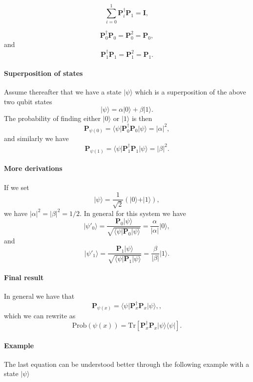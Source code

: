 \[
\sum_{i=0}^1\bm{P}_i^{\dagger}\bm{P}_1=\bm{I},
\]

\[
\bm{P}_0^{\dagger}\bm{P}_0=\bm{P}_0^2=\bm{P}_0,
\]
and
\[
\bm{P}_1^{\dagger}\bm{P}_1=\bm{P}_1^2=\bm{P}_1.
\]


\paragraph{Superposition of states}

Assume thereafter that we have a state $\vert \psi\rangle$ which is a superposition of the above two qubit states
\[
\vert \psi \rangle = \alpha\vert 0 \rangle + \beta \vert 1\rangle.
\]
The probability of finding either $\vert 0\rangle$ or $\vert 1\rangle$ is then
\[
\bm{P}_{\psi(0)}=\langle \psi\vert \bm{P}_0^{\dagger}\bm{P}_0\vert \psi\rangle=\vert \alpha\vert^2,
\]
and similarly we have 
\[
\bm{P}_{\psi(1)}=\langle \psi\vert \bm{P}_1^{\dagger}\bm{P}_1\vert \psi\rangle=\vert \beta\vert^2.
\]

\paragraph{More derivations}

If we set 
\[
\vert \psi \rangle = \frac{1}{\sqrt{2}}\left(\vert 0 \rangle + \vert 1\rangle\right),
\]
we have $\vert \alpha\vert^2=\vert \beta\vert^2=1/2$. In general for this system we have
\[
\vert \psi'_0\rangle = \frac{\bm{P}_0\vert \psi\rangle}{\sqrt{\langle \psi \vert \bm{P}_0\vert \psi\rangle}}=\frac{\alpha}{\vert \alpha\vert}\vert 0 \rangle,
\]
and
\[
\vert \psi'_1\rangle = \frac{\bm{P}_1\vert \psi\rangle}{\sqrt{\langle \psi \vert \bm{P}_1\vert \psi\rangle}}=\frac{\beta}{\vert \beta\vert}\vert 1 \rangle. 
\]


\paragraph{Final result}
In general we have that 
\[
\bm{P}_{\psi(x)}=\langle \psi\vert \bm{P}_x^{\dagger}\bm{P}_x\vert \psi\rangle,,
\]
which we can rewrite as
\[
\mathrm{Prob}(\psi(x))=\mathrm{Tr}\left[\bm{P}_x^{\dagger}\bm{P}_x\vert \psi\rangle\langle \psi\vert\right].
\]


\paragraph{Example}

The last equation can be understood better through the following example with a state $\vert \psi\rangle$


